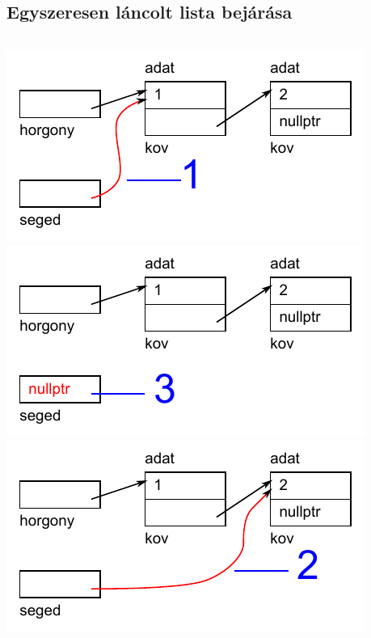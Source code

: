 \documentclass[usenames,dvipsnames,aspectratio=169]{beamer}
\begin{document}
\subsection{Egyszeresen láncolt lista bejárása}
\begin{frame}[fragile]
  \scriptsize
  \begin{columns}[t]
      \includegraphics[scale=.7]{lista1/list1-10.pdf} \\
      \vspace{1cm}
      \includegraphics[scale=.7]{lista1/list1-12.pdf}
      \includegraphics[scale=.7]{lista1/list1-11.pdf} \\
      \begin{exampleblock}{}
        \scriptsize
        
      \end{exampleblock}
  \end{columns}
\end{frame}
\end{document}
